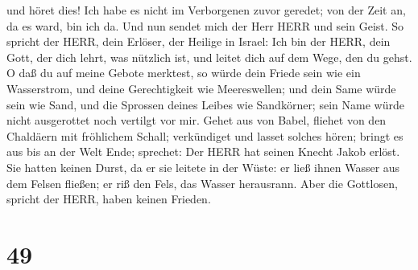 und höret dies! Ich habe es nicht im Verborgenen zuvor geredet; von der
Zeit an, da es ward, bin ich da. Und nun sendet mich der Herr HERR und
sein Geist.  So spricht der HERR, dein Erlöser, der Heilige
in Israel: Ich bin der HERR, dein Gott, der dich lehrt, was nützlich
ist, und leitet dich auf dem Wege, den du gehst.  O daß du
auf meine Gebote merktest, so würde dein Friede sein wie ein
Wasserstrom, und deine Gerechtigkeit wie Meereswellen;  und
dein Same würde sein wie Sand, und die Sprossen deines Leibes wie
Sandkörner; sein Name würde nicht ausgerottet noch vertilgt vor mir.
 Gehet aus von Babel, fliehet von den Chaldäern mit
fröhlichem Schall; verkündiget und lasset solches hören; bringt es aus
bis an der Welt Ende; sprechet: Der HERR hat seinen Knecht Jakob erlöst.
 Sie hatten keinen Durst, da er sie leitete in der Wüste:
er ließ ihnen Wasser aus dem Felsen fließen; er riß den Fels, das Wasser
herausrann.  Aber die Gottlosen, spricht der HERR, haben
keinen Frieden.

\hypertarget{section-48}{%
\section{49}\label{section-48}}

